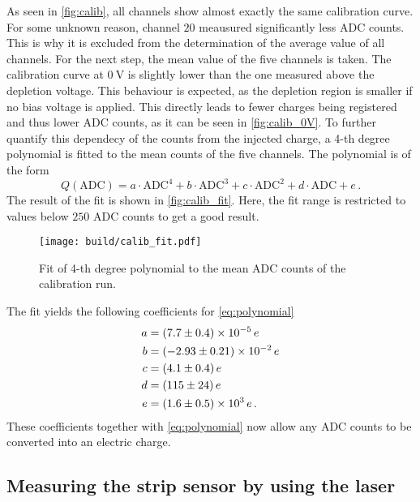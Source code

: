 As seen in \autoref{fig:calib}, all channels show almost exactly the same calibration curve.
For some unknown reason, channel $20$ meausured significantly less ADC counts.
This is why it is excluded from the determination of the average value of all channels.
For the next step, the mean value of the five channels is taken. The calibration curve at
$\qty{0}{\volt}$ is slightly lower than the one measured above the depletion voltage. This
behaviour is expected, as the depletion region is smaller if no bias voltage is applied.
This directly leads to fewer charges being registered and thus lower ADC counts, as it can be seen in \autoref{fig:calib_0V}.
To further quantify this dependecy of the counts from the injected charge, a 4-th degree
polynomial is fitted to the mean counts of the five channels. The polynomial is of the form
\begin{equation}
  Q(\text{ADC}) = a\cdot\text{ADC}^4 + b\cdot\text{ADC}^3 + c\cdot\text{ADC}^2 + d\cdot\text{ADC} + e \, .
  \label{eq:polynomial}
\end{equation}
The result of the fit is shown in \autoref{fig:calib_fit}. Here, the fit range is restricted to values
below $250$ ADC counts to get a good result.

\begin{figure}[H]
  \centering
  \texttt{[image: build/calib\_fit.pdf]}
  \caption{Fit of 4-th degree polynomial to the mean ADC counts of the calibration run.}
  \label{fig:calib_fit}
\end{figure}

The fit yields the following coefficients for \eqref{eq:polynomial}
\begin{align*}
  a &= \qty{7.7(0.4)e-5}{\elementarycharge} \\
  b &= \qty{-2.93(0.21)e-2}{\elementarycharge} \\
  c &= \qty{4.1+-0.4}{\elementarycharge} \\
  d &= \qty{115+-24}{\elementarycharge} \\
  e &= \qty{1.6(0.5)e+3}{\elementarycharge} \, .
\end{align*}
These coefficients together with \eqref{eq:polynomial} now allow any ADC counts
to be converted into an electric charge.


\subsection{Measuring the strip sensor by using the laser}

